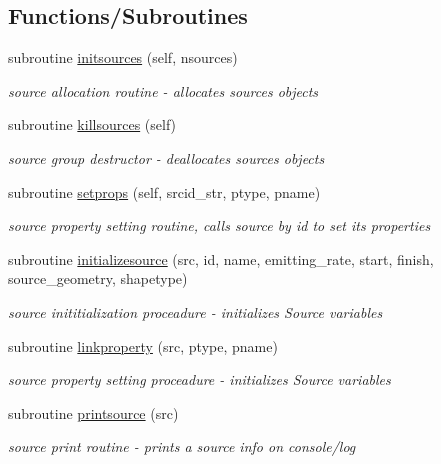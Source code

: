 \subsection*{Functions/\+Subroutines}
\begin{DoxyCompactItemize}
\item 
subroutine \mbox{\hyperlink{namespacesources__mod_a6da3303e5c39d77c0111ec50623bf5fe}{initsources}} (self, nsources)
\begin{DoxyCompactList}\small\item\em source allocation routine -\/ allocates sources objects \end{DoxyCompactList}\item 
subroutine \mbox{\hyperlink{namespacesources__mod_aee745aa084adcfa41ecfc3469b90aa8e}{killsources}} (self)
\begin{DoxyCompactList}\small\item\em source group destructor -\/ deallocates sources objects \end{DoxyCompactList}\item 
subroutine \mbox{\hyperlink{namespacesources__mod_aa02996b7219ce9c9d26439e8d2d0a468}{setprops}} (self, srcid\+\_\+str, ptype, pname)
\begin{DoxyCompactList}\small\item\em source property setting routine, calls source by id to set its properties \end{DoxyCompactList}\item 
subroutine \mbox{\hyperlink{namespacesources__mod_a6dcf7a3e3ccf75e01853df166231d484}{initializesource}} (src, id, name, emitting\+\_\+rate, start, finish, source\+\_\+geometry, shapetype)
\begin{DoxyCompactList}\small\item\em source inititialization proceadure -\/ initializes Source variables \end{DoxyCompactList}\item 
subroutine \mbox{\hyperlink{namespacesources__mod_a683ca7e4aca7a0050aad9f506569fca9}{linkproperty}} (src, ptype, pname)
\begin{DoxyCompactList}\small\item\em source property setting proceadure -\/ initializes Source variables \end{DoxyCompactList}\item 
subroutine \mbox{\hyperlink{namespacesources__mod_a641fe9ecc295e486a714c1aaa133d991}{printsource}} (src)
\begin{DoxyCompactList}\small\item\em source print routine -\/ prints a source info on console/log \end{DoxyCompactList}\end{DoxyCompactItemize}
